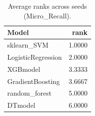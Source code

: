 \begin{table}[t]
\centering
\begin{tabular}{lr}
\toprule
Model & rank \\
\midrule
sklearn_SVM & 1.0000 \\
LogisticRegression & 2.0000 \\
XGBmodel & 3.3333 \\
GradientBoosting & 3.6667 \\
random_forest & 5.0000 \\
DTmodel & 6.0000 \\
\bottomrule
\end{tabular}
\caption{Average ranks across seeds (Micro_Recall).}
\label{tab:avg_rank_Micro_Recall}
\end{table}